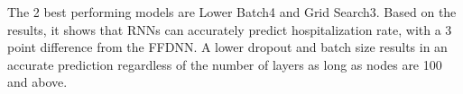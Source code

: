\documentclass[10pt,11pt,12pt,oneside]{book}
\begin{document}
    The 2 best performing models are Lower Batch4 and Grid Search3. Based on the results, it shows that RNNs can accurately predict hospitalization rate, with a 3 point difference from the FFDNN. A lower dropout and batch size results in an accurate prediction regardless of the number of layers as long as nodes are 100 and above.   
 
    
    
    
\end{document}
